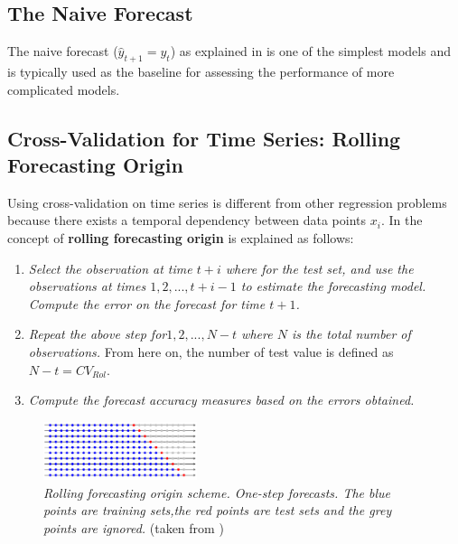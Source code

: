 \subsection{The Naive Forecast}

The naive forecast ($\hat{y}_{t+1}=y_{t}$) as explained in \cite{makridakis2008forecasting} is one of the simplest models and is typically used as the baseline for assessing the performance of more complicated models.


\subsection{Cross-Validation for Time Series: Rolling Forecasting Origin}

Using cross-validation on time series is different from other regression problems because there exists a temporal dependency between data points $x_{i}$. In \cite{hyndman2006another} the concept of \textbf{rolling forecasting origin} is explained as follows:

\begin{enumerate}
	\item \textit{ Select the observation at time $t + i$ where for the test set, and use the observations at times $1, 2, . . . , t+i-1$ to estimate the forecasting model. Compute the error on the forecast for time $t + 1$.}
	\item \textit{ Repeat the above step for$1, 2, . . . , N-t$ where $N$ is the total number of observations.} From here on, the number of test value is defined as $N-t=CV_{Rol}$.
	\item \textit{ Compute the forecast accuracy measures based on the errors obtained.}
\end{enumerate}

\begin{figure}[htpb!] %
	\centering %
	\includegraphics[width=0.4\textwidth]{notebooks/data/cv_time.png} %
	\caption{\textit{ Rolling forecasting origin scheme. One-step forecasts. The blue points are training sets,the red points are test sets and the grey points are ignored.} (taken from \cite{hyndman2006another} )} %
	\label{fig:cross validation} %
\end{figure}



